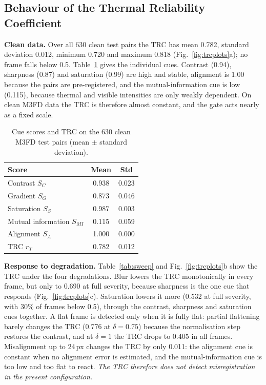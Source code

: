 \documentclass[journal]{IEEEtran}
\newcommand{\rT}{r_T}
\begin{document}
\subsection{Behaviour of the Thermal Reliability Coefficient}
\textbf{Clean data.} Over all 630 clean test pairs the TRC has mean 0.782, standard deviation 0.012, minimum 0.720 and maximum 0.818 (Fig.~\ref{fig:trcplots}a); no frame falls below 0.5. Table~\ref{tab:cues} gives the individual cues. Contrast (0.94), sharpness (0.87) and saturation (0.99) are high and stable, alignment is 1.00 because the pairs are pre-registered, and the mutual-information cue is low (0.115), because thermal and visible intensities are only weakly dependent. On clean M3FD data the TRC is therefore almost constant, and the gate acts nearly as a fixed scale.

\begin{table}[!t]
\centering
\caption{Cue scores and TRC on the 630 clean M3FD test pairs (mean $\pm$ standard deviation).}
\label{tab:cues}
\footnotesize
\setlength{\tabcolsep}{6pt}
\begin{tabular}{@{}lcc@{}}
\toprule
Score & Mean & Std \\
\midrule
Contrast $S_C$ & 0.938 & 0.023 \\
Gradient $S_G$ & 0.873 & 0.046 \\
Saturation $S_S$ & 0.987 & 0.003 \\
Mutual information $S_{MI}$ & 0.115 & 0.059 \\
Alignment $S_A$ & 1.000 & 0.000 \\
TRC $\rT$ & 0.782 & 0.012 \\
\bottomrule
\end{tabular}
\end{table}

\textbf{Response to degradation.} Table~\ref{tab:sweep} and Fig.~\ref{fig:trcplots}b show the TRC under the four degradations. Blur lowers the TRC monotonically in every frame, but only to 0.690 at full severity, because sharpness is the one cue that responds (Fig.~\ref{fig:trcplots}c). Saturation lowers it more (0.532 at full severity, with 30\% of frames below 0.5), through the contrast, sharpness and saturation cues together. A flat frame is detected only when it is fully flat: partial flattening barely changes the TRC (0.776 at $\delta=0.75$) because the normalisation step restores the contrast, and at $\delta=1$ the TRC drops to 0.405 in all frames. Misalignment up to 24\,px changes the TRC by only 0.011: the alignment cue is constant when no alignment error is estimated, and the mutual-information cue is too low and too flat to react. \emph{The TRC therefore does not detect misregistration in the present configuration.}
\end{document}
